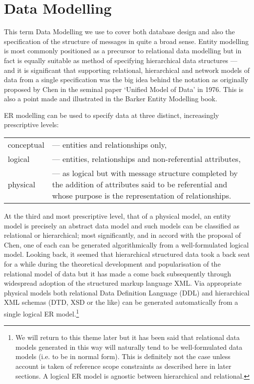 \section{Data Modelling}
\label{DataModelling}
\mynote This term Data Modelling we use to cover both database design and also the specification of the structure of messages in quite a broad sense. Entity modelling is most commonly positioned as a precursor to relational data modelling but in fact is equally suitable as method of specifying hierarchical data structures — and it is significant that supporting relational, hierarchical and network models of data from a single specification was the big idea behind the notation as originally proposed by Chen in the seminal paper ‘Unified Model of Data’ in 1976. This is also a point made and illustrated in the Barker Entity Modelling book.

\mynote ER modelling can be used to specify data at three distinct, increasingly prescriptive levels:

\begin{tabular}{l p{8.5cm}}
conceptual &— entities and relationships only,\\
logical &— entities, relationships and non-referential attributes,\\
physical &— as logical but with message structure completed by the addition of attributes said to be referential and whose purpose is the representation of relationships.\\
\end{tabular}

At the third and most prescriptive level, that of a physical model, an entity model is precisely an abstract data model and such models can be classified as relational or hierarchical; most significantly, and in accord with the proposal of Chen, one of each can be generated algorithmically from a well-formulated logical model. Looking back, it seemed that hierarchical structured data took a back seat for a while during the theoretical development and popularisation of the relational model of data but it has made a come back subsequently through widespread adoption of the structured markup language XML. Via appropriate physical models both relational Data Definition Language (DDL) and hierarchical XML schemas (DTD, XSD or the like) can be generated automatically from a single logical ER model.\footnote{We will return to this theme later but it has been said that relational data models generated in this way will naturally tend to be well-formulated data models (i.e. to be in normal form). This is definitely not the case unless account is taken of reference scope constraints as described here in later sections. A logical ER model is agnostic between hierarchical and relational.}

